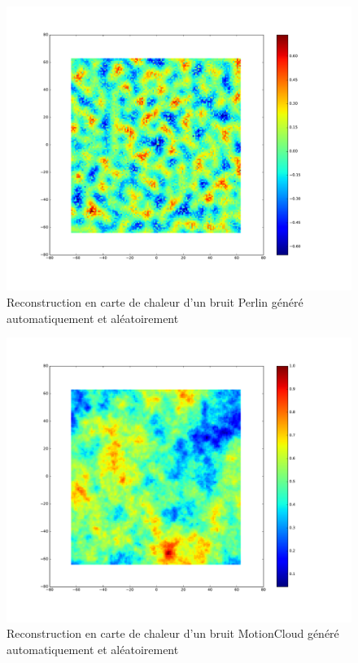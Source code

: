 \begin{figure}[th]
\centering
\includegraphics[scale=0.4]{Figures/perlin_noise}
\decoRule
\caption[Figure]{Reconstruction en carte de chaleur d'un bruit Perlin généré automatiquement et aléatoirement \autocite{Perlin1985}}
\label{fig:perlin_noise}
\end{figure}

\begin{figure}[th]
\centering
\includegraphics[scale=0.4]{Figures/motioncloud_noise}
\decoRule
\caption[Figure]{Reconstruction en carte de chaleur d'un bruit MotionCloud généré automatiquement et aléatoirement \autocite{Leon2012}}
\label{fig:motioncloud_noise}
\end{figure}

